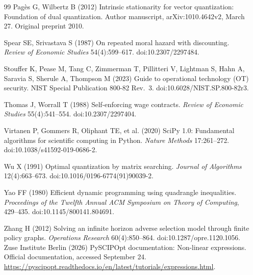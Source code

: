 \begin{thebibliography}{99}
Pag\`es G, Wilbertz B (2012) Intrinsic stationarity for vector quantization: Foundation of dual quantization. Author manuscript, arXiv:1010.4642v2, March 27. Original preprint 2010.

Spear SE, Srivastava S (1987) On repeated moral hazard with discounting. \emph{Review of Economic Studies} 54(4):599--617. doi:10.2307/2297484.

Stouffer K, Pease M, Tang C, Zimmerman T, Pillitteri V, Lightman S, Hahn A, Saravia S, Sherule A, Thompson M (2023) Guide to operational technology (OT) security. NIST Special Publication 800-82 Rev.~3. doi:10.6028/NIST.SP.800-82r3.

Thomas J, Worrall T (1988) Self-enforcing wage contracts. \emph{Review of Economic Studies} 55(4):541--554. doi:10.2307/2297404.

Virtanen P, Gommers R, Oliphant TE, et al. (2020) SciPy 1.0: Fundamental algorithms for scientific computing in Python. \emph{Nature Methods} 17:261--272. doi:10.1038/s41592-019-0686-2.

Wu X (1991) Optimal quantization by matrix searching. \emph{Journal of Algorithms} 12(4):663--673. doi:10.1016/0196-6774(91)90039-2.

Yao FF (1980) Efficient dynamic programming using quadrangle inequalities. \emph{Proceedings of the Twelfth Annual ACM Symposium on Theory of Computing}, 429--435. doi:10.1145/800141.804691.

Zhang H (2012) Solving an infinite horizon adverse selection model through finite policy graphs. \emph{Operations Research} 60(4):850--864. doi:10.1287/opre.1120.1056.
Zuse Institute Berlin (2026) PySCIPOpt documentation: Non-linear expressions. Official documentation, accessed September 24. \url{https://pyscipopt.readthedocs.io/en/latest/tutorials/expressions.html}.
\end{thebibliography}
